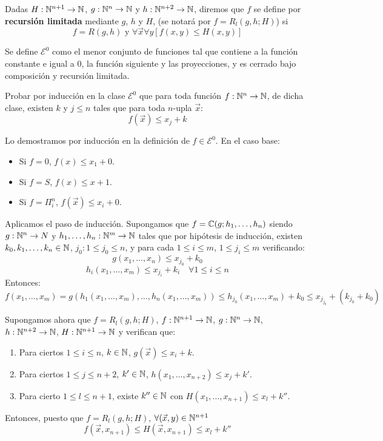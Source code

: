 \documentclass[twoside]{article}
\begin{document}
\begin{ejercicio}{30}
Dadas $H : \mathbb{N}^{n+1} \to \mathbb{N}$, $g : \mathbb{N}^n \to \mathbb{N}$ y $h : \mathbb{N}^{n+2} \to \mathbb{N}$, diremos que $f$ se define por \textbf{recursión limitada} mediante $g$, $h$ y $H$, (se notará por $f = R_l(g,h;H)$) si
\[ f = R(g,h) \text{ y } \forall \vec{x} \forall y [f(x,y) ≤ H(x,y)] \]

Se define $\mathcal{E}^0$ como el menor conjunto de funciones tal que contiene a la función constante e igual a $0$, la función siguiente y las proyecciones, y es cerrado bajo composición y recursión limitada.

Probar por inducción en la clase $\mathcal{E}^0$ que para toda función $f : \mathbb{N}^n \to \mathbb{N}$, de dicha clase, existen $k$ y $j ≤ n$ tales que para toda $n$-upla $\vec{x}$:
\[ f(\vec{x}) ≤ x_j + k \]
\end{ejercicio}
\begin{sol}
Lo demostramos por inducción en la definición de $f \in \mathcal{E}^0$. En el caso base:
\begin{itemize}
	\item Si $f = 0$, $f(x) ≤ x_1+0$.
	\item Si $f = S$, $f(x) ≤ x+1$.
	\item Si $f = Π_i^n$, $f(\vec{x}) ≤ x_i+0$.
\end{itemize}
Aplicamos el paso de inducción. Supongamos que $f = \mathbb{C}(g;h_1,\dots,h_n)$ siendo $g : \mathbb{N}^n \to N$ y $h_1,\dots,h_n : \mathbb{N}^m \to \mathbb{N}$ tales que por hipótesis de inducción, existen $k_0,k_1,\dots,k_n \in \mathbb{N}$, $j_0 : 1 ≤ j_0≤n$, y para cada $1≤i≤m$, $1≤j_i≤m$ verificando:
\[ g(x_1,\dots,x_n) ≤ x_{j_0}+k_0 \]
\[ h_i(x_1,\dots,x_m) ≤ x_{j_i} + k_i \quad \forall 1≤i≤n\]
Entonces:
\[ f(x_1,\dots,x_m) = g(h_1(x_1,\dots,x_m),\dots,h_n(x_1,\dots,x_m)) ≤ h_{j_0}(x_1,\dots,x_m) + k_0 ≤ x_{j_{j_0}} + (k_{j_0} + k_0) \]

Supongamos ahora que $f = R_l(g,h;H)$, $f : \mathbb{N}^{n+1} \to \mathbb{N}$, $g : \mathbb{N}^n \to \mathbb{N}$, $h : \mathbb{N}^{n+2} \to \mathbb{N}$, $H : \mathbb{N}^{n+1}\to\mathbb{N}$ y verifican que:
\begin{enumerate}
	\item Para ciertos $1≤i≤n$, $k \in \mathbb{N}$, $g(\vec{x})≤x_i+k$.
	\item Para ciertos $1≤j≤n+2$, $k' \in \mathbb{N}$, $h(x_1,\dots,x_{n+2})≤x_j+k'$.
	\item  Para cierto $1≤l≤n+1$, existe $k'' \in \mathbb{N}$ con $H(x_1,\dots,x_{n+1}) ≤ x_l + k''$.
\end{enumerate}
Entonces, puesto que $f = R_l(g,h;H)$, $\forall (\vec{x},y) \in \mathbb{N}^{n+1}$
\[ f(\vec{x},x_{n+1}) ≤ H(\vec{x},x_{n+1}) ≤ x_l + k'' \]
\end{sol}
\end{document}
